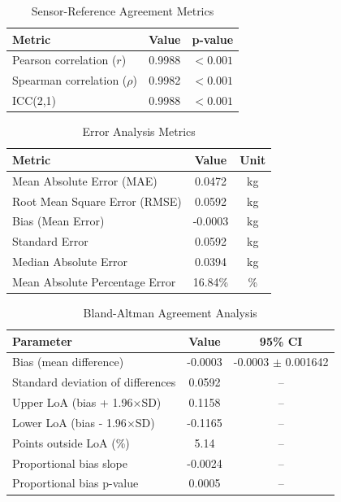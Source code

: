

\begin{table}[h]
\centering
\caption{Sensor-Reference Agreement Metrics}
\label{tab:agreement}
\begin{tabular}{lcc}
\hline
\textbf{Metric} & \textbf{Value} & \textbf{p-value} \\
\hline
Pearson correlation ($r$) & 0.9988 & $<0.001$ \\
Spearman correlation ($\rho$) & 0.9982 & $<0.001$ \\
ICC(2,1) & 0.9988 & $<0.001$ \\
\hline
\end{tabular}
\end{table}



\begin{table}[h]
\centering
\caption{Error Analysis Metrics}
\label{tab:errors}
\begin{tabular}{lcc}
\hline
\textbf{Metric} & \textbf{Value} & \textbf{Unit} \\
\hline
Mean Absolute Error (MAE) & 0.0472 & kg \\
Root Mean Square Error (RMSE) & 0.0592 & kg \\
Bias (Mean Error) & -0.0003 & kg \\
Standard Error & 0.0592 & kg \\
Median Absolute Error & 0.0394 & kg \\
Mean Absolute Percentage Error & 16.84\% & \% \\
\hline
\end{tabular}
\end{table}



\begin{table}[h]
\centering
\caption{Bland-Altman Agreement Analysis}
\label{tab:bland_altman}
\begin{tabular}{lcc}
\hline
\textbf{Parameter} & \textbf{Value} & \textbf{95\% CI} \\
\hline
Bias (mean difference) & -0.0003 & -0.0003 $\pm$ 0.001642 \\
Standard deviation of differences & 0.0592 & -- \\
Upper LoA (bias + 1.96$\times$SD) & 0.1158 & -- \\
Lower LoA (bias - 1.96$\times$SD) & -0.1165 & -- \\
Points outside LoA (\%) & 5.14 & -- \\
Proportional bias slope & -0.0024 & -- \\
Proportional bias p-value & 0.0005 & -- \\
\hline
\end{tabular}
\end{table}



